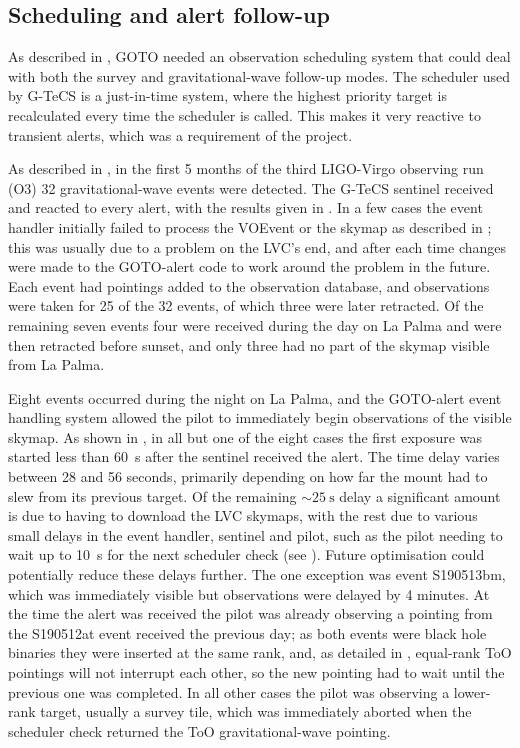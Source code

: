 \subsection{Scheduling and alert follow-up}
\label{sec:gw_results}
\begin{colsection}

As described in , GOTO needed an observation scheduling system that could deal with both the survey and gravitational-wave follow-up modes. The scheduler used by G-TeCS is a just-in-time system, where the highest priority target is recalculated every time the scheduler is called. This makes it very reactive to transient alerts, which was a requirement of the project.

As described in , in the first 5 months of the third LIGO-Virgo observing run (O3) 32 gravitational-wave events were detected. The G-TeCS sentinel received and reacted to every alert, with the results given in . In a few cases the event handler initially failed to process the VOEvent or the skymap as described in ; this was usually due to a problem on the LVC's end, and after each time changes were made to the GOTO-alert code to work around the problem in the future. Each event had pointings added to the observation database, and observations were taken for 25 of the 32 events, of which three were later retracted. Of the remaining seven events four were received during the day on La Palma and were then retracted before sunset, and only three had no part of the skymap visible from La Palma.

Eight events occurred during the night on La Palma, and the GOTO-alert event handling system allowed the pilot to immediately begin observations of the visible skymap. As shown in , in all but one of the eight cases the first exposure was started less than \SI{60}{\second} after the sentinel received the alert. The time delay varies between 28 and 56 seconds, primarily depending on how far the mount had to slew from its previous target. Of the remaining $\sim\SI{25}{\second}$ delay a significant amount is due to having to download the LVC skymaps, with the rest due to various small delays in the event handler, sentinel and pilot, such as the pilot needing to wait up to \SI{10}{\second} for the next scheduler check (see ). Future optimisation could potentially reduce these delays further. The one exception was event S190513bm, which was immediately visible but observations were delayed by 4 minutes. At the time the alert was received the pilot was already observing a pointing from the S190512at event received the previous day; as both events were black hole binaries they were inserted at the same rank, and, as detailed in , equal-rank ToO pointings will not interrupt each other, so the new pointing had to wait until the previous one was completed. In all other cases the pilot was observing a lower-rank target, usually a survey tile, which was immediately aborted when the scheduler check returned the ToO gravitational-wave pointing.


\end{colsection}
